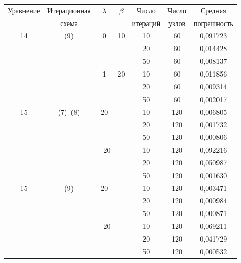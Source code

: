 {\hfil


\begin{tabular}{|c|c|c|c|c|c|c|}


\hline


Уравнение & Итерационная & $\lambda$ & $\beta$ & Число & Число & Средняя \\


& схема & & & итераций & узлов & погрешность\\


\hline


14 & (9) & 0 & 10 & 10 & 60 & 0,091723 \\


& & & & 20 & 60 & 0,014428 \\


& & & & 50 & 60 & 0,008137 \\


& & 1 & 20 & 10 & 60 & 0,011856 \\


& & & & 20 & 60 & 0,009314 \\


& & & & 50 & 60 & 0,002017 \\


15 & (7)--(8) & 20 & & 10 & 120 & 0,006805 \\


& & & & 20 & 120 & 0,001732 \\


& & & & 50 & 120 & 0,000806 \\


& & $-20$ & & 10 & 120 & 0,092216 \\


& & & & 20 & 120 & 0,050987 \\


& & & & 50 & 120 & 0,001630 \\


15 & (9) & 20 & & 10 & 120 & 0,003471 \\


& & & & 20 & 120 & 0,000984 \\


& & & & 50 & 120 & 0,000871 \\


& & $-20$ & & 10 & 120 & 0,069211 \\


& & & & 20 & 120 & 0,041729 \\


& & & & 50 & 120 & 0,000532 \\


\hline


\end{tabular}


\hfil}


